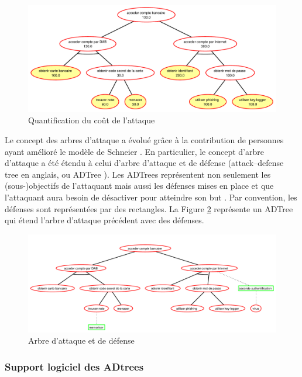         \begin{figure}[h]
	        \centering
	        \includegraphics[width=1\textwidth]{figure/quantification.pdf}
	        \caption{Quantification du coût de l'attaque}
	        \label{fig:arbre_exemple_2}
        \end{figure}

		Le concept des arbres d'attaque a évolué grâce à la contribution de personnes ayant amélioré le modèle de Schneier \cite{ADTreeKordy}. En particulier, le concept d'arbre d'attaque a été étendu à celui d’arbre d’attaque et de défense (\og attack–defense tree \fg{} en anglais, ou \og ADTree \fg{}). Les ADTrees représentent non seulement les (sous-)objectifs de l'attaquant mais aussi les défenses mises en place et que l'attaquant aura besoin de désactiver pour atteindre son but \cite{ADTreeOxford}. Par convention, les défenses sont représentées par des rectangles. La Figure \ref{fig:arbre_exemple_3} représente un ADTree qui étend l'arbre d'attaque précédent avec des défenses.
        \begin{figure}[h]
			\centering
	        \includegraphics[width=1\textwidth]{figure/exemple2_rapport.pdf}
	        \caption{Arbre d'attaque et de défense}
	        \label{fig:arbre_exemple_3}
        \end{figure}



        \subsubsection{Support logiciel des ADtrees}

